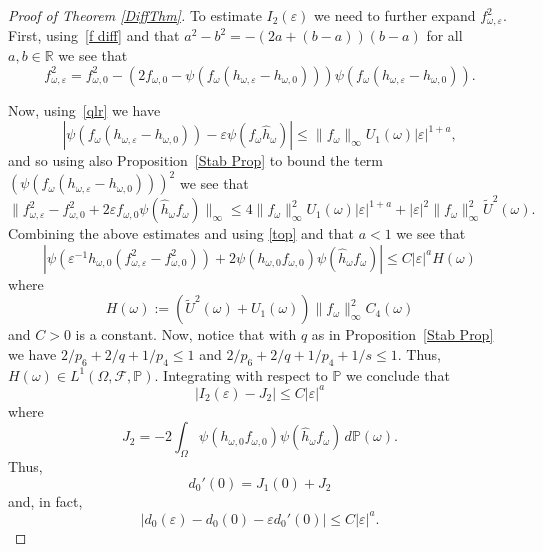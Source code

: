 \documentclass[11pt,reqno,a4paper]{article}
\theoremstyle{special}
\def\om{\omega}
\begin{document}
\begin{proof}[Proof of Theorem \ref{DiffThm}]
To estimate $I_2(\varepsilon)$ we need to further expand $f_{\om, \varepsilon}^2$. First, using~\eqref{f diff} and that 
$a^2-b^2=-(2a+(b-a))(b-a)$ for all $a,b\in\mathbb R$ we see that 
\begin{equation}\label{e}
 f^2_{\om, \varepsilon}=f^2_{\om, 0}-(2f_{\om, 0}-\psi(f_\om(h_{\om, \varepsilon}-h_{\om, 0})))\psi(f_\om(h_{\om, \varepsilon}-h_{\om, 0})).   
\end{equation}

Now, using~\eqref{qlr} we have 
$$
|\psi(f_\om(h_{\om, \varepsilon}-h_{\om, 0}))-\varepsilon\psi(f_\om\hat h_\om)|\leq \|f_\om\|_\infty U_1(\om)|\varepsilon|^{1+a},
$$
and so using also Proposition~\ref{Stab Prop} to bound the term $(\psi(f_\om(h_{\om, \varepsilon}-h_{\om, 0})))^2$ we see that 
$$
\|f^2_{\om, \varepsilon}-f^2_{\om, 0}+2\varepsilon f_{\om, 0}\psi(\hat h_\om f_\om)\|_\infty\leq 4\|f_\om\|_\infty^2 U_1(\om)|\varepsilon|^{1+a}+|\varepsilon|^2\|f_\om\|_\infty^2\tilde U^2(\om).
$$
Combining the above estimates and using \eqref{top} and that $a<1$ we see that 
$$
\left|\psi(\varepsilon^{-1}h_{\om,0}(f_{\om,\varepsilon}^2-f_{\om,0}^2))+2\psi(h_{\om,0}f_{\om,0})\psi(\hat h_\om f_\om)\right|\leq C|\varepsilon|^aH(\om)
$$
where
$$
H(\om):=
 (\tilde U^2(\om)+U_1(\om))\|f_\om\|_\infty^2 C_4(\om) 
$$
and $C>0$ is a constant.
Now, notice that with  $q$  as  in Proposition~\ref{Stab Prop} we have  $2/p_6+2/q+1/p_4\leq 1$ and $2/p_6+2/q+1/p_4+1/s\leq 1$. 
Thus, 
$
H(\om)\in L^1(\Omega,\mathcal F,\mathbb P).
$
Integrating with respect to $\mathbb P$ we conclude that
$$
|I_2(\varepsilon)-J_2|\leq C|\varepsilon|^{a}
$$
where 
$$
J_2=-2\int_\Omega \psi(h_{\om, 0}f_{\om, 0})\psi(\hat h_\om f_\om)\, d\mathbb P(\om).
$$
Thus, 
$$
d_0'(0)=J_1(0)+J_2
$$
and, in fact,
$$
|d_0(\varepsilon)-d_0(0)-\varepsilon d_0'(0)|\leq C|\varepsilon|^a.
$$



\end{proof}
\end{document}
